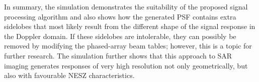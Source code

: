 \par
In summary, the simulation demonstrates the suitability of the proposed signal processing algorithm and also shows how the generated PSF contains extra sidelobes that most likely result from the different shape of the signal response in the Doppler domain. If these sidelobes are intolerable, they can possibly be removed by modifying the phased-array beam tables; however, this is a topic for further research. The simulation further shows that this approach to SAR imaging generates responses of very high resolution not only geometrically, but also with favourable NESZ characteristics.
\clearpage
%
